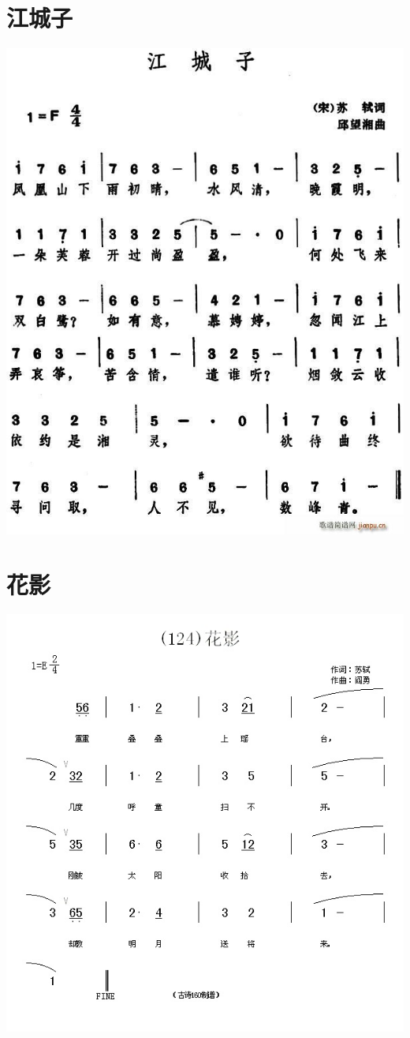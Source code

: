 \documentclass[cn,pad,chinesefont=nofont,twocol]{elegantbook}
\begin{document}
\section{江城子}
    \includegraphics[width=\textwidth]{dongxiao/20200627-苏轼-江城子.jpg} 
\section{花影}
    \includegraphics[width=\textwidth]{dongxiao/20200627-苏轼-花影.jpg} 
\end{document}
